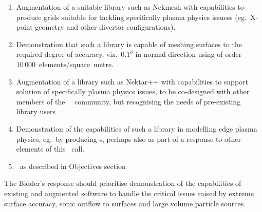 \begin{enumerate}
\item Augmentation of a suitable library such as Nekmesh with capabilities to
produce grids suitable for tackling specifically plasma physics issuess
(eg.\ X-point geometry and other divertor configurations).
\item Demonstration that such a library is capable of meshing
surfaces to the required degree of accuracy, viz.\ $0.1^{o}$
in normal direction using of order~$10\,000$\, elements/square~metre.
\item Augmentation of a library such as Nektar++ with capabilities to
support solution of specifically plasma physics issues,
to be co-designed with other members of the \exc \ \nep \ community,
but recognising the needs of pre-existing library users
\item Demonstration of the capabilities of such a library in modelling
edge plasma physics, eg.\ by producing \papp s, perhaps also as 
part of a response to other elements of this \nep\ call.
\item \Papp\  as described in Objectives section
\end{enumerate}

The Bidder's response should prioritise demonstration of the capabilities
of existing and augmented software to handle the critical issues raised
by extreme surface accuracy, sonic outflow to surfaces and
large volume particle sources.
%

